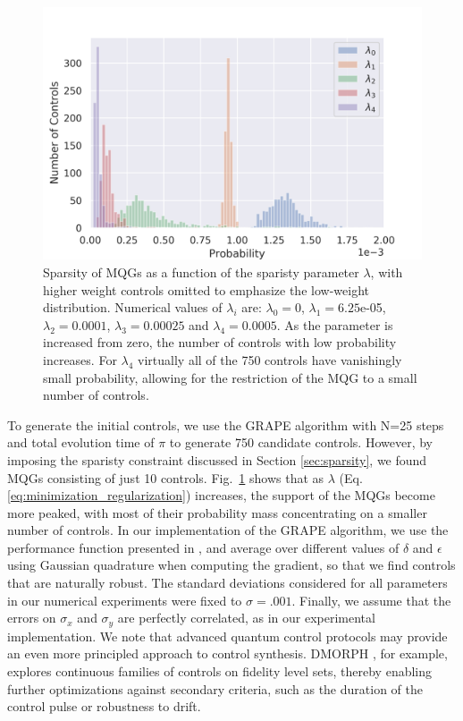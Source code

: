\documentclass[aps,nofootinbib,pra,notitlepage,twocolumn]{revtex4-1}
\newcommand{\0}{\ensuremath{\mathbf{0}}}
\begin{document}
{\begin{figure}
\includegraphics[scale=.5]{sparisity-versus-parameter.png}
\caption{Sparsity of MQGs as a function of the sparisty parameter $\lambda$, with higher weight controls omitted to emphasize the low-weight distribution. Numerical values of $\lambda_i$ are: $\lambda_0=0$, $\lambda_1=6.25$e-05, $\lambda_2=0.0001$, $\lambda_3=0.00025$ and $\lambda_4=0.0005$. As the parameter is increased from zero, the number of controls with low probability increases. For $\lambda_4$ virtually all of the 750 controls have vanishingly small probability, allowing for the restriction of the MQG to a small number of controls.}
\label{fig:sparsity}
\end{figure}
To generate the initial controls, we use the GRAPE algorithm\cite{Khaneja2005} with N=25 steps and total evolution time of $\pi$ to generate 750 candidate controls. However, by imposing the sparisty constraint discussed in Section \ref{sec:sparsity}, we found MQGs consisting of just 10 controls. Fig.~\ref{fig:sparsity} shows that as $\lambda$ (Eq. \eqref{eq:minimization_regularization}) increases, the support of the MQGs become more peaked, with most of their probability mass concentrating on a smaller number of controls. In our implementation of the GRAPE algorithm, we use the performance function presented in \cite{Khaneja2005}, and average over different values of $\delta$ and $\epsilon$ using Gaussian quadrature when computing the gradient, so that we find controls that are naturally robust. The standard deviations considered for all parameters in our numerical experiments were fixed to $\sigma=.001$. Finally, we assume that the errors on $\sigma_x$ and $\sigma_y$ are perfectly correlated, as in our experimental implementation. We note that advanced quantum control protocols may provide an even more principled approach to control synthesis. DMORPH \cite{dominy2008exploring}, for example, explores continuous families of controls on fidelity level sets, thereby enabling further optimizations against secondary criteria, such as the duration of the control pulse or robustness to drift. 

}
\end{document}
